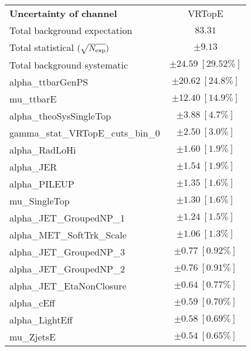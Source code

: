 
\begin{table}
\begin{center}
\setlength{\tabcolsep}{0.0pc}
\begin{tabular*}{\textwidth}{@{\extracolsep{\fill}}lc}
\noalign{\smallskip}\hline\noalign{\smallskip}
{\bf Uncertainty of channel}                                    & VRTopE            \\
\noalign{\smallskip}\hline\noalign{\smallskip}
Total background expectation             &  $83.31$       \\
\noalign{\smallskip}\hline\noalign{\smallskip}
Total statistical $(\sqrt{N_{\rm exp}})$              & $\pm 9.13$       \\
Total background systematic               & $\pm 24.59\ [29.52\%] $             \\
\noalign{\smallskip}\hline\noalign{\smallskip}
\noalign{\smallskip}\hline\noalign{\smallskip}
alpha\_ttbarGenPS         & $\pm 20.62\ [24.8\%] $       \\
mu\_ttbarE         & $\pm 12.40\ [14.9\%] $       \\
alpha\_theoSysSingleTop         & $\pm 3.88\ [4.7\%] $       \\
gamma\_stat\_VRTopE\_cuts\_bin\_0         & $\pm 2.50\ [3.0\%] $       \\
alpha\_RadLoHi         & $\pm 1.60\ [1.9\%] $       \\
alpha\_JER         & $\pm 1.54\ [1.9\%] $       \\
alpha\_PILEUP         & $\pm 1.35\ [1.6\%] $       \\
mu\_SingleTop         & $\pm 1.30\ [1.6\%] $       \\
alpha\_JET\_GroupedNP\_1         & $\pm 1.24\ [1.5\%] $       \\
alpha\_MET\_SoftTrk\_Scale         & $\pm 1.06\ [1.3\%] $       \\
alpha\_JET\_GroupedNP\_3         & $\pm 0.77\ [0.92\%] $       \\
alpha\_JET\_GroupedNP\_2         & $\pm 0.76\ [0.91\%] $       \\
alpha\_JET\_EtaNonClosure         & $\pm 0.64\ [0.77\%] $       \\
alpha\_cEff         & $\pm 0.59\ [0.70\%] $       \\
alpha\_LightEff         & $\pm 0.58\ [0.69\%] $       \\
mu\_ZjetsE         & $\pm 0.54\ [0.65\%] $       \\

\end{tabular*}
\end{center}
\end{table}

